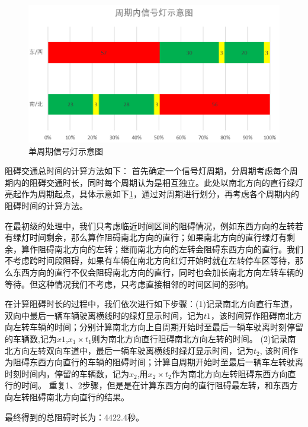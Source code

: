\begin{figure}[H]
    \centering
    \includegraphics[scale=0.5]{figures/单周期信号灯示意图.png}
    \caption{单周期信号灯示意图}
    \label{fig:单周期}
\end{figure}

阻碍交通总时间的计算方法如下：
首先确定一个信号灯周期，分周期考虑每个周期内的阻碍交通时长，同时每个周期认为是相互独立。此处以南北方向的直行绿灯亮起作为周期起点，具体示意如下\ref{fig:单周期}，通过对周期进行划分，再考虑各个周期内的阻碍时间的计算方法。

在最初级的处理中，我们只考虑临近时间区间的阻碍情况，例如东西方向的左转若有绿灯时间剩余，那么算作阻碍南北方向的直行；如果南北方向的直行绿灯有剩余，算作阻碍南北方向的左转；继而南北方向的左转会阻碍东西方向的直行。我们不考虑跨时间段阻碍，如果有车辆在南北方向红灯开始时就在左转停车区等待，那么东西方向的直行不仅会阻碍南北方向的直行，同时也会加长南北方向左转车辆的等待。但这种情况我们不考虑，只考虑直接相邻的时间区间的影响。

在计算阻碍时长的过程中，我们依次进行如下步骤：(1)记录南北方向直行车道，双向中最后一辆车辆驶离横线时的绿灯显示时间，记为$t1$，该时间算作阻碍南北方向左转车辆的时间；分别计算南北方向上自周期开始时至最后一辆车驶离时刻停留的车辆数,记为$x1$,$x_1\times t_1$则为南北方向直行阻碍南北方向左转的时间。
(2)记录南北方向左转双向车道中，最后一辆车驶离横线时绿灯显示时间，记为$t_2$, 该时间作为阻碍东西方向直行的车辆的阻碍时间；计算自周期开始时至最后一辆车左转驶离时刻时间内，停留的车辆数，记为$x_2$,用$x_2 \times t_2$作为南北方向左转阻碍东西方向直行的时间。
重复1、2步骤，但是是在计算东西方向的直行阻碍最左转，和东西方向左转阻碍南北方向直行的结果。

最终得到的总阻碍时长为：4422.4秒。